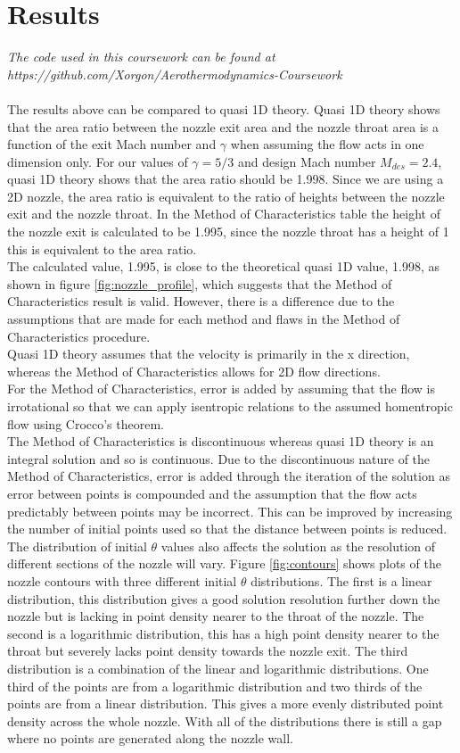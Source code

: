 \documentclass[10pt,a4paper]{article}
\begin{document}
\section{Results}
\textit{The code used in this coursework can be found at https://github.com/Xorgon/Aerothermodynamics-Coursework}
\\\\The results above can be compared to quasi 1D theory. Quasi 1D theory shows that the area ratio between the nozzle exit area and the nozzle throat area is a function of the exit Mach number and $\gamma$ when assuming the flow acts in one dimension only. For our values of $\gamma = 5/3$ and design Mach number $M_{des}=2.4$, quasi 1D theory shows that the area ratio should be 1.998. Since we are using a 2D nozzle, the area ratio is equivalent to the ratio of heights between the nozzle exit and the nozzle throat. In the Method of Characteristics table the height of the nozzle exit is calculated to be 1.995, since the nozzle throat has a height of 1 this is equivalent to the area ratio.
\\The calculated value, 1.995, is close to the theoretical quasi 1D value, 1.998, as shown in figure \ref{fig:nozzle_profile}, which suggests that the Method of Characteristics result is valid. However, there is a difference due to the assumptions that are made for each method and flaws in the Method of Characteristics procedure.
\\Quasi 1D theory assumes that the velocity is primarily in the x direction, whereas the Method of Characteristics allows for 2D flow directions. 
\\For the Method of Characteristics, error is added by assuming that the flow is irrotational so that we can apply isentropic relations to the assumed homentropic flow using Crocco's theorem.
\\The Method of Characteristics is discontinuous whereas quasi 1D theory is an integral solution and so is continuous. Due to the discontinuous nature of the Method of Characteristics, error is added through the iteration of the solution as error between points is compounded and the assumption that the flow acts predictably between points may be incorrect. This can be improved by increasing the number of initial points used so that the distance between points is reduced.
\\The distribution of initial $\theta$ values also affects the solution as the resolution of different sections of the nozzle will vary. Figure \ref{fig:contours} shows plots of the nozzle contours with three different initial $\theta$ distributions. The first is a linear distribution, this distribution gives a good solution resolution further down the nozzle but is lacking in point density nearer to the throat of the nozzle. The second is a logarithmic distribution, this has a high point density nearer to the throat but severely lacks point density towards the nozzle exit. The third distribution is a combination of the linear and logarithmic distributions. One third of the points are from a logarithmic distribution and two thirds of the points are from a linear distribution. This gives a more evenly distributed point density across the whole nozzle. With all of the distributions there is still a gap where no points are generated along the nozzle wall.
\end{document}
